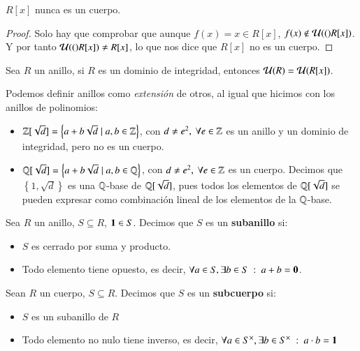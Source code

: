 \begin{pro}
    $R[x]$ nunca es un cuerpo.
\end{pro}
\begin{proof}
    Solo hay que comprobar que aunque $f(x) = x \in R[x]$, $f(x) \notin \mathcal{U}(()R[x])$. Y por tanto $\mathcal{U}(()R[x]) \neq R[x]$, lo que nos dice que $R[x]$ no es un cuerpo.
\end{proof}

\begin{pro}
    Sea $R$ un anillo, si $R$ es un dominio de integridad, entonces $\mathcal{U}(R) = \mathcal{U}(R[x])$.
\end{pro}

\begin{obs}
    Podemos definir anillos como \textit{extensión} de otros, al igual que hicimos con los anillos de polinomios:\\
    \begin{itemize}
        \item $\mathbb{Z}[\sqrt{d}] = \left\{a + b\sqrt{d} \mid a,b \in \mathbb{Z} \right\}$, con $d \neq e^2,\ \forall e \in \mathbb{Z}$ es un anillo y un dominio de integridad, pero no es un cuerpo.
        \item $\mathbb{Q}[\sqrt{d}] = \left\{a + b\sqrt{d} \mid a,b \in \mathbb{Q} \right\}$, con $d \neq e^2,\ \forall e \in \mathbb{Z}$ es un cuerpo. Decimos que $\left\{ 1, \sqrt{d} \right\}$ es una $\mathbb{Q}$-base de $\mathbb{Q}[\sqrt{d}]$, pues todos los elementos de $\mathbb{Q}[\sqrt{d}]$ se pueden expresar como combinación lineal de los elementos de la $\mathbb{Q}$-base.
    \end{itemize}
\end{obs}

\begin{dfn}[Subanillo]
    Sea $R$ un anillo, $S \subseteq R$, $\mathbf{1} \in S$. Decimos que $S$ es un \textbf{subanillo} si:
    \begin{itemize}
        \item $S$ es cerrado por suma y producto.
        \item Todo elemento tiene opuesto, es decir, $\forall a \in S, \exists b \in S\ :\ a + b = \mathbf{0}$.
    \end{itemize}
\end{dfn}

\begin{dfn}[Subcuerpo]
    Sean $R$ un cuerpo, $S \subseteq R$. Decimos que $S$ es un \textbf{subcuerpo} si:
    \begin{itemize}
        \item $S$ es un subanillo de $R$
        \item Todo elemento no nulo tiene inverso, es decir, $\forall a \in S^{\times}, \exists b \in S^{\times}\ :\ a \cdot b = \1$
    \end{itemize}
\end{dfn}

